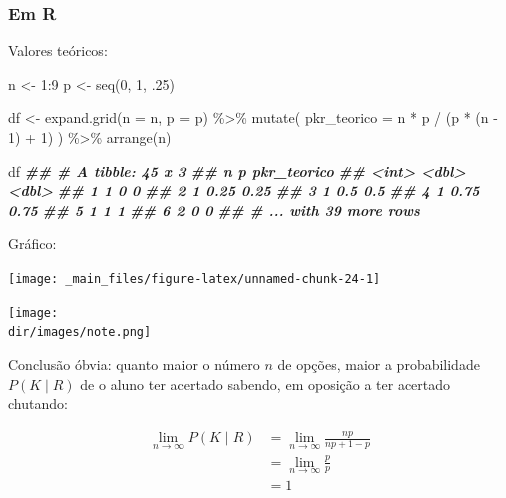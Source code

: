 \documentclass[
  11pt]{report}
\newenvironment{Shaded}{\begin{snugshade}}{\end{snugshade}}
\newcommand{\AttributeTok}[1]{\textcolor[rgb]{0.77,0.63,0.00}{#1}}
\newcommand{\DecValTok}[1]{\textcolor[rgb]{0.00,0.00,0.81}{#1}}
\newcommand{\DocumentationTok}[1]{\textcolor[rgb]{0.56,0.35,0.01}{\textbf{\textit{#1}}}}
\newcommand{\FunctionTok}[1]{\textcolor[rgb]{0.00,0.00,0.00}{#1}}
\newcommand{\NormalTok}[1]{#1}
\newcommand{\OtherTok}[1]{\textcolor[rgb]{0.56,0.35,0.01}{#1}}
\newcommand{\SpecialCharTok}[1]{\textcolor[rgb]{0.00,0.00,0.00}{#1}}
\newcommand{\dir}{/ssd/R/x86_64-pc-linux-gnu-library/4.1/fnaufelRmd/rmarkdown/resources}
\newenvironment{rmdnote}
{
  \begin{mynote}
    \texttt{[image: \\dir/images/note.png]}
    \tcblower
  }
  {
  \end{mynote}
}
\renewenvironment{Shaded}{
    \begin{mdframed}[%
      roundcorner=2pt,%
      innerleftmargin=5pt,%
      innerrightmargin=5pt,%
      topline=true,%
      leftline=true,%
      rightline=true,%
      bottomline=true,%
      linewidth=0.5pt,%
      linecolor=black!20,%
      backgroundcolor=black!2,%
      skipabove=2ex,%
      skipbelow=2.5ex%
    ]%
  }
  {
    \end{mdframed}
  }
\begin{document}
\hypertarget{em-r}{%
\subsubsection*{Em R}\label{em-r}}

Valores teóricos:

\begin{Shaded}
\begin{Highlighting}[]
\NormalTok{n }\OtherTok{\textless{}{-}} \DecValTok{1}\SpecialCharTok{:}\DecValTok{9}
\NormalTok{p }\OtherTok{\textless{}{-}} \FunctionTok{seq}\NormalTok{(}\DecValTok{0}\NormalTok{, }\DecValTok{1}\NormalTok{, .}\DecValTok{25}\NormalTok{)}

\NormalTok{df }\OtherTok{\textless{}{-}} \FunctionTok{expand.grid}\NormalTok{(}\AttributeTok{n =}\NormalTok{ n, }\AttributeTok{p =}\NormalTok{ p) }\SpecialCharTok{\%\textgreater{}\%} 
  \FunctionTok{mutate}\NormalTok{(}
    \AttributeTok{pkr\_teorico =}\NormalTok{ n }\SpecialCharTok{*}\NormalTok{ p }\SpecialCharTok{/}\NormalTok{ (p }\SpecialCharTok{*}\NormalTok{ (n }\SpecialCharTok{{-}} \DecValTok{1}\NormalTok{) }\SpecialCharTok{+} \DecValTok{1}\NormalTok{)}
\NormalTok{  ) }\SpecialCharTok{\%\textgreater{}\%} 
  \FunctionTok{arrange}\NormalTok{(n)}

\NormalTok{df}
\DocumentationTok{\#\# \# A tibble: 45 x 3}
\DocumentationTok{\#\#       n     p pkr\_teorico}
\DocumentationTok{\#\#   \textless{}int\textgreater{} \textless{}dbl\textgreater{}       \textless{}dbl\textgreater{}}
\DocumentationTok{\#\# 1     1  0           0   }
\DocumentationTok{\#\# 2     1  0.25        0.25}
\DocumentationTok{\#\# 3     1  0.5         0.5 }
\DocumentationTok{\#\# 4     1  0.75        0.75}
\DocumentationTok{\#\# 5     1  1           1   }
\DocumentationTok{\#\# 6     2  0           0   }
\DocumentationTok{\#\# \# ... with 39 more rows}
\end{Highlighting}
\end{Shaded}

Gráfico:

\begin{center}\texttt{[image: \_main\_files/figure-latex/unnamed-chunk-24-1]} \end{center}

\begin{rmdnote}
Conclusão óbvia: quanto maior o número $n$ de opções, maior a probabilidade $P(K \mid R)$ de o aluno ter acertado sabendo, em oposição a ter acertado chutando:

\[
\begin{aligned}
\lim_{n \to \infty} P(K \mid R) 
&=
\lim_{n \to \infty} \frac{np}{np + 1 - p} \\
&=
\lim_{n \to \infty} \frac{p}{p} \\
&= 1
\end{aligned}
\]

\end{rmdnote}
\end{document}
